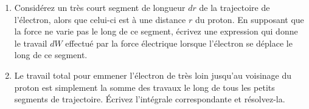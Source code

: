\documentclass{tufte-handout}
\begin{document}
\begin{enumerate}
  \item Considérez un très court segment de longueur $dr$ de la trajectoire de
    l'électron, alors que celui-ci est à une distance $r$ du proton. En
    supposant que la force ne varie pas le long de ce segment, écrivez une
    expression qui donne le
    travail $dW$ effectué par la force électrique lorsque l'électron se déplace
    le long de ce segment.

  \item Le travail total pour emmener l'électron de très loin jusqu'au
    voisinage du proton est simplement la somme des travaux le long de tous les
    petits segments de trajectoire. Écrivez l'intégrale correspondante et
    résolvez-la.
\end{enumerate}
\end{document}
